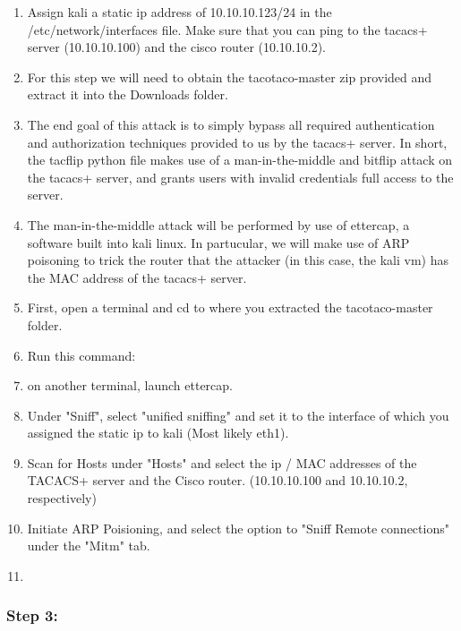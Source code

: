 \documentclass[main.tex]{subfiles}
\begin{document}
\begin{itemize}
\begin{enumerate}[noitemsep,label=$\bullet$,leftmargin=20mm,labelsep=0.5cm]
\item Assign kali a static ip address of 10.10.10.123/24 in the /etc/network/interfaces file. Make sure that you can ping to the tacacs+ server (10.10.10.100) and the cisco router (10.10.10.2).

\item For this step we will need to obtain the tacotaco-master zip provided and extract it into the Downloads folder. 

\item The end goal of this attack is to simply bypass all required authentication and authorization techniques provided to us by the tacacs+ server. In short, the tacflip python file makes use of a man-in-the-middle and bitflip attack on the tacacs+ server, and grants users with invalid credentials full access to the server.

\item The man-in-the-middle attack will be performed by use of ettercap, a software built into kali linux. In partucular, we will make use of ARP poisoning to trick the router that the attacker (in this case, the kali vm) has the MAC address of the tacacs+ server.

\item First, open a terminal and cd to where you extracted the tacotaco-master folder.

\item Run this command:

\item on another terminal, launch ettercap.


\item Under "Sniff", select "unified sniffing" and set it to the interface of which you assigned the static ip to kali (Most likely eth1).  

\item Scan for Hosts under "Hosts" and select the ip / MAC addresses of the TACACS+ server and the Cisco router. (10.10.10.100 and 10.10.10.2, respectively)

\item Initiate ARP Poisioning, and select the option to "Sniff Remote connections" under the "Mitm" tab.

\item 




\end{enumerate}


\subsubsection{Step 3: }
\begin{enumerate}[noitemsep,label=$\bullet$,leftmargin=20mm,labelsep=0.5cm]    


\end{enumerate}









\end{itemize}
\end{document}
